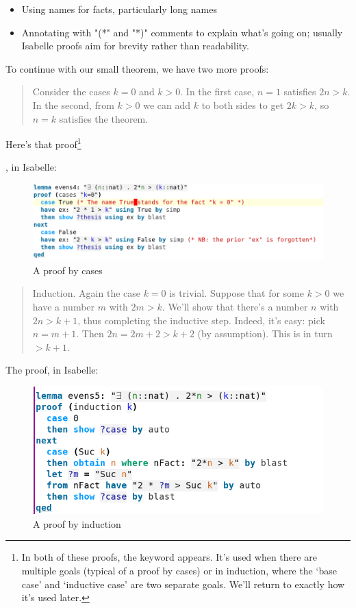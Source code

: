 \begin{itemize}
    \item Using names for facts, particularly long names
    \item Annotating with "(*" and  "*)" comments to explain what's going on; usually Isabelle proofs aim for brevity rather than readability.
\end{itemize}

To continue with our small theorem, we have two more proofs: 

\begin{quotation}
Consider the cases $k = 0$ and $k > 0$. In the first case, $n = 1$ satisfies $2n > k$. In the second, from $k > 0$ we can add $k$ to both sides to get $2k > k$, so $n = k$ satisfies the theorem.
\end{quotation}

Here's that proof\footnote{In both of these proofs, the keyword  appears. It's used when there are multiple goals (typical of a proof by cases) or in induction, where the `base case' and `inductive case' are two separate goals. We'll return to exactly how it's used later.}

, in Isabelle:
\begin{figure}[h]
    \includegraphics[width=1\linewidth]{TEXT/C01/Images/proof2.png}
    \caption{A proof by cases}
\end{figure}

\begin{quotation}    
Induction. Again the case $k = 0$ is trivial. Suppose that for some $k > 0$ we have a number $m$ with $2m > k$. We'll show that there's a number $n$ with $2n > k+1$, thus completing the inductive step. Indeed, it's easy: pick $n = m + 1$. Then $2n = 2m + 2  > k + 2$ (by assumption). This is in turn $> k + 1.$ 
\end{quotation}

The proof, in Isabelle:

\begin{figure}[ht]
    \centering
    \includegraphics[width=0.75\linewidth]{TEXT/C01/Images/proof3.png}
    \caption{A proof by induction}
\end{figure}


